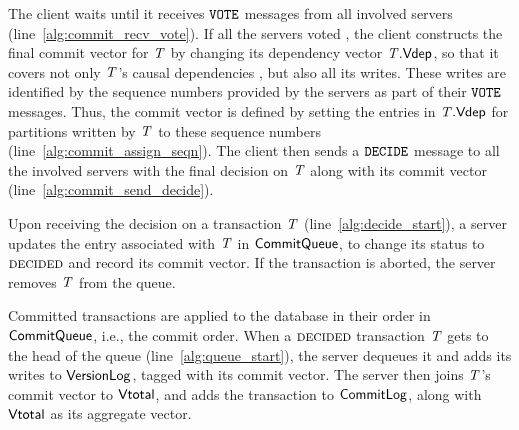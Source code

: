 The client waits until it receives ${\tt VOTE}$ messages from all involved servers (line~\ref{alg:commit_recv_vote}). If all the servers voted \commit, the client constructs the final commit vector for $\mathit{T}$ by changing its dependency vector $\mathit{T}.\mathsf{Vdep}$, so that it covers not only $\mathit{T}$'s causal dependencies , but also all its writes. These writes are identified by the sequence numbers provided by the servers as part of their ${\tt VOTE}$ messages. Thus, the commit vector is defined by setting the entries in $\mathit{T}.\mathsf{Vdep}$ for partitions written by $\mathit{T}$ to these sequence numbers (line~\ref{alg:commit_assign_seqn}). The client then sends a ${\tt DECIDE}$ message to all the involved servers with the final decision on $\mathit{T}$ along with its commit vector (line~\ref{alg:commit_send_decide}).

Upon receiving the decision on a transaction $\mathit{T}$ (line~\ref{alg:decide_start}), a server updates the entry associated with $\mathit{T}$ in $\mathsf{CommitQueue}$, to change its status to $\text{\sc decided}$ and record its commit vector. If the transaction is aborted, the server removes $\mathit{T}$ from the queue.

Committed transactions are applied to the database in their order in $\mathsf{CommitQueue}$, i.e., the commit order. When a $\text{\sc decided}$ transaction $\mathit{T}$ gets to the head of the queue (line~\ref{alg:queue_start}), the server dequeues it and adds its writes to $\mathsf{VersionLog}$, tagged with its commit vector. The server then joins $\mathit{T}$'s commit vector to $\mathsf{Vtotal}$, and adds the transaction to $\mathsf{CommitLog}$, along with $\mathsf{Vtotal}$ as its aggregate vector.


